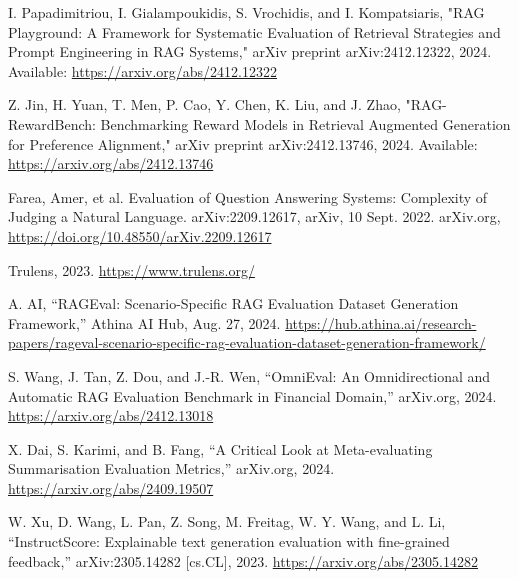 \begin{thebibliography}{00}
 I. Papadimitriou, I. Gialampoukidis, S. Vrochidis, and I. Kompatsiaris, "RAG Playground: A Framework for Systematic Evaluation of Retrieval Strategies and Prompt Engineering in RAG Systems," arXiv preprint arXiv:2412.12322, 2024. Available: \url{https://arxiv.org/abs/2412.12322}

 Z. Jin, H. Yuan, T. Men, P. Cao, Y. Chen, K. Liu, and J. Zhao, "RAG-RewardBench: Benchmarking Reward Models in Retrieval Augmented Generation for Preference Alignment," arXiv preprint arXiv:2412.13746, 2024. Available: \url{https://arxiv.org/abs/2412.13746}

 Farea, Amer, et al. Evaluation of Question Answering Systems: Complexity of Judging a Natural Language. arXiv:2209.12617, arXiv, 10 Sept. 2022. arXiv.org, \url{https://doi.org/10.48550/arXiv.2209.12617}

 Trulens, 2023. \url{https://www.trulens.org/}

 A. AI, “RAGEval: Scenario-Specific RAG Evaluation Dataset Generation Framework,” Athina AI Hub, Aug. 27, 2024. \url{https://hub.athina.ai/research-papers/rageval-scenario-specific-rag-evaluation-dataset-generation-framework/}

 S. Wang, J. Tan, Z. Dou, and J.-R. Wen, “OmniEval: An Omnidirectional and Automatic RAG Evaluation Benchmark in Financial Domain,” arXiv.org, 2024. \url{https://arxiv.org/abs/2412.13018}

 X. Dai, S. Karimi, and B. Fang, “A Critical Look at Meta-evaluating Summarisation Evaluation Metrics,” arXiv.org, 2024. \url{https://arxiv.org/abs/2409.19507}

 W. Xu, D. Wang, L. Pan, Z. Song, M. Freitag, W. Y. Wang, and L. Li, “InstructScore: Explainable text generation evaluation with fine-grained feedback,” arXiv:2305.14282 [cs.CL], 2023. \url{ https://arxiv.org/abs/2305.14282}

\end{thebibliography}